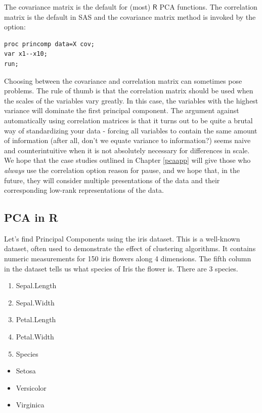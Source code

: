 \documentclass[
]{article}
\providecommand{\tightlist}{%
  \setlength{\itemsep}{0pt}\setlength{\parskip}{0pt}}
\theoremstyle{definition}
\theoremstyle{definition}
\theoremstyle{definition}
\theoremstyle{definition}
\theoremstyle{remark}
\begin{document}
The covariance matrix is the default for (most) \(\textsf{R}\) PCA functions. The correlation matrix is the default in SAS and the covariance matrix method is invoked by the option:

\begin{verbatim}
proc princomp data=X cov; 
var x1--x10;
run;
\end{verbatim}

Choosing between the covariance and correlation matrix can sometimes pose problems. The rule of thumb is that the correlation matrix should be used when the scales of the variables vary greatly. In this case, the variables with the highest variance will dominate the first principal component. The argument against automatically using correlation matrices is that it turns out to be quite a brutal way of standardizing your data - forcing all variables to contain the same amount of information (after all, don't we equate variance to information?) seems naive and counterintuitive when it is not absolutely necessary for differences in scale. We hope that the case studies outlined in Chapter \ref{pcaapp} will give those who \emph{always} use the correlation option reason for pause, and we hope that, in the future, they will consider multiple presentations of the data and their corresponding low-rank representations of the data.

\hypertarget{pca-in-r}{%
\subsection{PCA in R}\label{pca-in-r}}

Let's find Principal Components using the iris dataset. This is a well-known dataset, often used to demonstrate the effect of clustering algorithms. It contains numeric measurements for 150 iris flowers along 4 dimensions. The fifth column in the dataset tells us what species of Iris the flower is. There are 3 species.

\begin{enumerate}
\def\labelenumi{\arabic{enumi}.}
\tightlist
\item
  Sepal.Length
\item
  Sepal.Width
\item
  Petal.Length
\item
  Petal.Width
\item
  Species
\end{enumerate}

\begin{itemize}
\tightlist
\item
  Setosa
\item
  Versicolor
\item
  Virginica
\end{itemize}
\end{document}

